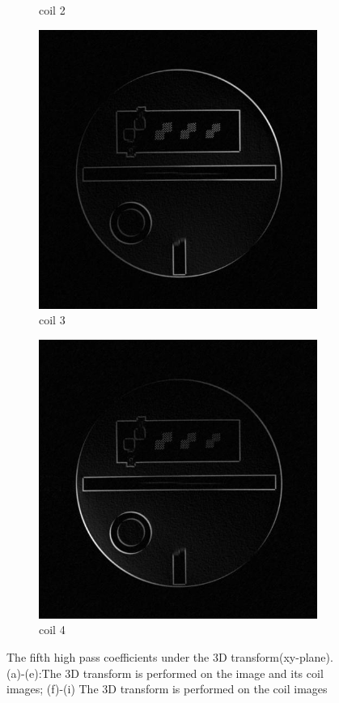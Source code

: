 \documentclass[UTF8]{article}
\begin{document}
\begin{figure}[ht]
\begin{subfigure}[h]{0.2\textwidth}
		\caption{coil 2 }
		\label{fig:3c}
	\end{subfigure}
	\begin{subfigure}[h]{0.2\textwidth}
		\centering
		\includegraphics[scale=0.15]{./image/3cc.jpg}
		\caption{coil 3 }
		\label{fig:3d}
	\end{subfigure}
	\begin{subfigure}[h]{0.2\textwidth}
		\centering
		\includegraphics[scale=0.15]{./image/4cc.jpg}
		\caption{coil 4 }
		\label{fig:3e}
	\end{subfigure}
	\caption{The fifth high pass coefficients under the 3D transform(xy-plane). (a)-(e):The 3D transform is performed on the image and its coil images; (f)-(i) The 3D transform is performed on the coil images}
	\label{coefs}
\end{figure}
\end{document}
